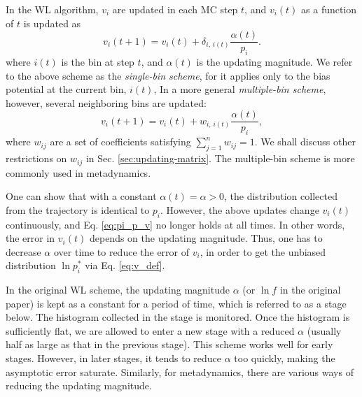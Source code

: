\documentclass[reprint]{revtex4-1}
\begin{document}
In the WL algorithm\cite{wang2001, wang2001pre},
$v_i$ are updated
in each MC step $t$,
and $v_i(t)$ as a function of $t$
is updated as
%
\begin{equation}
  v_i(t+1)
  =
  v_i(t)
  +
  \delta_{i, \, i(t)}
  \frac{ \alpha(t) } { p_i }.
  \label{eq:wl_update}
\end{equation}
%
where $i(t)$ is the bin at step $t$,
and $\alpha(t)$ is the updating magnitude.
%
We refer to the above scheme as the \emph{single-bin scheme},
for it applies only to the bias potential
at the current bin, $i(t)$,
%
In a more general \emph{multiple-bin scheme}, however,
several neighboring bins are updated:
%
\begin{equation}
  v_i(t+1)
  =
  v_i(t)
  +
  w_{i, \, i(t)}
  \frac{ \alpha(t) } { p_i },
  \label{eq:mbin_update}
\end{equation}
%
where $w_{ij}$ are a set of coefficients satisfying
$\sum_{j=1}^n w_{ij} = 1$.
%
We shall discuss other restrictions on $w_{ij}$
in Sec. \ref{sec:updating-matrix}.
%
The multiple-bin scheme is more commonly
used in metadynamics.



One can show that with a constant $\alpha(t) = \alpha > 0$,
the distribution collected from
the trajectory is identical to $p_i$.
%
However, the above updates
change $v_i(t)$ continuously,
and Eq. \eqref{eq:pi_p_v} no longer holds
at all times.
%
In other words,
the error in $v_i(t)$
depends on the updating magnitude\cite{
  zhou2005, liang2005, laio2005, bussi2006, poulain2006, liang2007,
  morozov2007, zhou2008, morozov2009, crespo2010,
  atchade2011, fort2015}.
%
Thus, one has to decrease $\alpha$ over time
to reduce the error of $v_i$,
in order to get the unbiased distribution
$\ln p_i^*$ via Eq. \eqref{eq:v_def}.





In the original WL scheme,
the updating magnitude $\alpha$ (or $\ln f$
in the original paper) is kept as a constant
for a period of time,
which is referred to as a stage below.
%
The histogram collected in the stage is monitored.
%
Once the histogram is sufficiently flat,
we are allowed to enter a new stage
with a reduced $\alpha$\cite{wang2001, wang2001pre}
(usually half as large as
that in the previous stage).
%
This scheme works well for early stages.
%
However, in later stages, it tends to reduce $\alpha$
too quickly, making the asymptotic error
saturate\cite{belardinelli2007, belardinelli2007jcp, belardinelli2008}.
%
Similarly, for metadynamics,
there are various ways of reducing the updating magnitude\cite{
  marsili2006, barducci2008, dickson2011, dama2014, dickson2015}.
\end{document}
